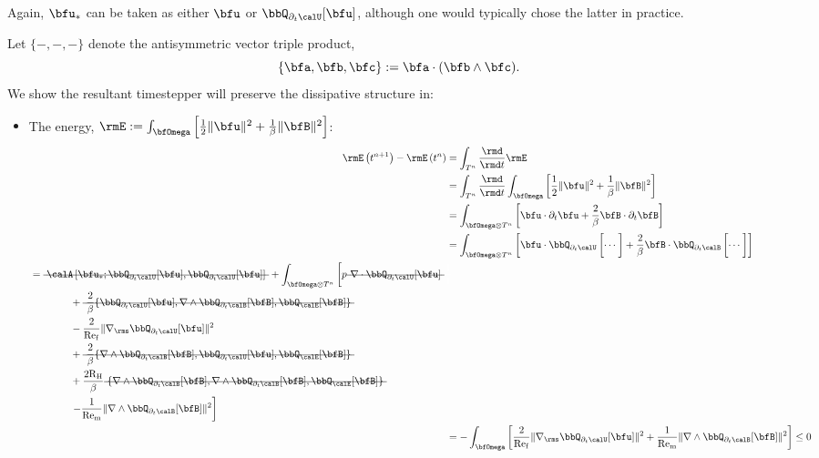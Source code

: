     Again, $\bfu_{*}$ can be taken as either $\bfu$ or $\bbQ_{\partial_{t}\calU}[\bfu]$, although one would typically chose the latter in practice.

    \shortline

    Let $\{-, -, -\}$ denote the antisymmetric vector triple product,
    \begin{equation}
        \{\bfa, \bfb, \bfc\}  :=  \bfa\cdot(\bfb\wedge\bfc).
    \end{equation}
    We show the resultant timestepper will preserve the dissipative structure in:
    \begin{itemize}
        \item  The energy, $\rmE  :=  \int_{\bfOmega}\left[\frac{1}{2}\|\bfu\|^{2} + \frac{1}{\beta}\|\bfB\|^{2}\right]$:
        \begin{align}
                \rmE\left(t^{n + 1}\right) - \rmE\left(t^{n}\right)
                &=  \int_{T^{n}}\frac{\rmd}{\rmd t}\rmE  \\
                &=  \int_{T^{n}}\frac{\rmd}{\rmd t}\int_{\bfOmega}\left[\frac{1}{2}\|\bfu\|^{2} + \frac{1}{\beta}\|\bfB\|^{2}\right]  \\
                &=  \int_{\bfOmega\otimes T^{n}}\left[\bfu\cdot\partial_{t}\bfu + \frac{2}{\beta}\bfB\cdot\partial_{t}\bfB\right]  \\
                &=  \int_{\bfOmega\otimes T^{n}}\left[\bfu\cdot\bbQ_{\partial_{t}\calU}\left[\cdots\tall\right] + \frac{2}{\beta}\bfB\cdot\bbQ_{\partial_{t}\calB}\left[\cdots\tall\right]\right]  \\
            \begin{split}
                &=  \mst{\calA\left[\bfu_{*}; \bbQ_{\partial_{t}\calU}[\bfu], \bbQ_{\partial_{t}\calU}[\bfu]\right]} + \int_{\bfOmega\otimes T^{n}}\left[p\mst{\nabla\cdot\bbQ_{\partial_{t}\calU}[\bfu]}\tall\right.  \\
                &\qquad\qquad+ \mst{\frac{2}{\beta}\{\bbQ_{\partial_{t}\calU}[\bfu], \nabla\wedge\bbQ_{\partial_{t}\calB}[\bfB], \bbQ_{\calE}[\bfB]\}}  \\
                &\qquad\qquad- \frac{2}{\rmRef}\|\nabla_{\rms}\bbQ_{\partial_{t}\calU}[\bfu]\|^{2}  \\
                &\qquad\qquad+ \mst{\frac{2}{\beta}\{\nabla\wedge\bbQ_{\partial_{t}\calB}[\bfB], \bbQ_{\partial_{t}\calU}[\bfu], \bbQ_{\calE}[\bfB]\}}  \\
                &\qquad\qquad+ \frac{2\rmRH}{\beta}\mst{\{\nabla\wedge\bbQ_{\partial_{t}\calB}[\bfB], \nabla\wedge\bbQ_{\partial_{t}\calB}[\bfB], \bbQ_{\calE}[\bfB]\}}  \\
                &\qquad\qquad\left.- \frac{1}{\rmRem}\|\nabla\wedge\bbQ_{\partial_{t}\calB}[\bfB]\|^{2}\right]
            \end{split}  \\
                &=  - \int_{\bfOmega}\left[\frac{2}{\rmRef}\|\nabla_{\rms}\bbQ_{\partial_{t}\calU}[\bfu]\|^{2} + \frac{1}{\rmRem}\|\nabla\wedge\bbQ_{\partial_{t}\calB}[\bfB]\|^{2}\right]  \leq  0
        \end{align}
        

\end{itemize}
